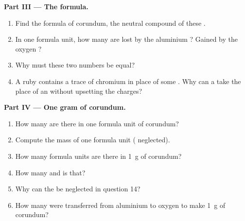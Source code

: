 \begin{problem}
\medskip
\noindent\textbf{Part III --- The formula.}
\begin{enumerate}[resume]
  \item Find the formula of corundum, the neutral compound of these .
  \item In one formula unit, how many  are lost by the aluminium
        ? Gained by the oxygen ?
  \item Why must these two numbers be equal?
  \item A ruby contains a trace of chromium   in place of
        some . Why can a   take the place of an
          without upsetting the charges?
\end{enumerate}

\medskip
\noindent\textbf{Part IV --- One gram of corundum.}
\begin{enumerate}[resume]
  \item How many  are there in one formula unit of corundum?
  \item Compute the mass of one formula unit ( neglected).
  \item How many formula units are there in \qty{1}{g} of corundum?
  \item How many   and   is that?
  \item Why can the  be neglected in question 14?
  \item How many  were transferred from aluminium to oxygen to
        make \qty{1}{g} of corundum?
\end{enumerate}
\end{problem}
